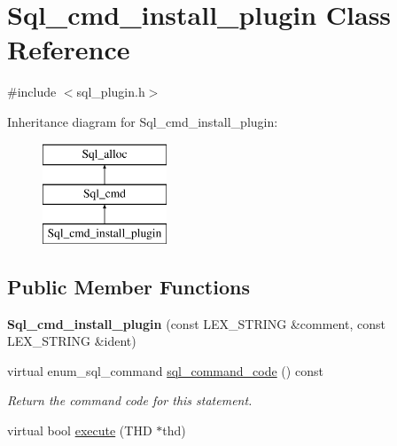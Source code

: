 \hypertarget{classSql__cmd__install__plugin}{}\section{Sql\+\_\+cmd\+\_\+install\+\_\+plugin Class Reference}
\label{classSql__cmd__install__plugin}


{\ttfamily \#include $<$sql\+\_\+plugin.\+h$>$}

Inheritance diagram for Sql\+\_\+cmd\+\_\+install\+\_\+plugin\+:\begin{figure}[H]
\begin{center}
\leavevmode
\includegraphics[height=3.000000cm]{classSql__cmd__install__plugin}
\end{center}
\end{figure}
\subsection*{Public Member Functions}
\begin{DoxyCompactItemize}
\item 
\mbox{\label{classSql__cmd__install__plugin_a9d6e4d85e219f8c560adce81bb52c777}} 
{\bfseries Sql\+\_\+cmd\+\_\+install\+\_\+plugin} (const L\+E\+X\+\_\+\+S\+T\+R\+I\+NG \&comment, const L\+E\+X\+\_\+\+S\+T\+R\+I\+NG \&ident)
\item 
\mbox{\label{classSql__cmd__install__plugin_a5137ea8cb15dac54ae45751d5c328986}} 
virtual enum\+\_\+sql\+\_\+command \mbox{\hyperlink{classSql__cmd__install__plugin_a5137ea8cb15dac54ae45751d5c328986}{sql\+\_\+command\+\_\+code}} () const
\begin{DoxyCompactList}\small\item\em Return the command code for this statement. \end{DoxyCompactList}\item 
virtual bool \mbox{\hyperlink{classSql__cmd__install__plugin_a8e128952dea83f34e1293bd1f8e14b21}{execute}} (T\+HD $\ast$thd)
\end{DoxyCompactItemize}
